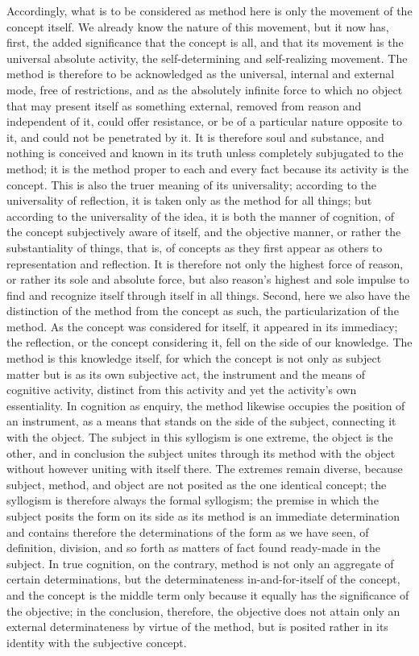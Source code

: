Accordingly, what is to be considered as method here is
only the movement of the concept itself.
We already know the nature of this movement,
but it now has, first, the added significance
that the concept is all,
and that its movement is the universal absolute activity,
the self-determining and self-realizing movement.
The method is therefore to be acknowledged as the universal,
internal and external mode, free of restrictions,
and as the absolutely infinite force to which
no object that may present itself as something external,
removed from reason and independent of it,
could offer resistance,
or be of a particular nature opposite to it,
and could not be penetrated by it.
It is therefore soul and substance,
and nothing is conceived and known in its truth
unless completely subjugated to the method;
it is the method proper to each and every fact
because its activity is the concept.
This is also the truer meaning of its universality;
according to the universality of reflection,
it is taken only as the method for all things;
but according to the universality of the idea,
it is both the manner of cognition,
of the concept subjectively aware of itself,
and the objective manner, or rather the
substantiality of things, that is,
of concepts as they first appear as others
to representation and reflection.
It is therefore not only the highest force of reason,
or rather its sole and absolute force,
but also reason's highest and sole impulse
to find and recognize itself through itself in all things.
Second, here we also have the distinction of
the method from the concept as such,
the particularization of the method.
As the concept was considered for itself,
it appeared in its immediacy;
the reflection, or the concept considering it,
fell on the side of our knowledge.
The method is this knowledge itself,
for which the concept is not only as subject matter
but is as its own subjective act,
the instrument and the means of cognitive activity,
distinct from this activity
and yet the activity's own essentiality.
In cognition as enquiry,
the method likewise occupies the position of an instrument,
as a means that stands on the side of the subject,
connecting it with the object.
The subject in this syllogism is one extreme,
the object is the other,
and in conclusion the subject unites
through its method with the object
without however uniting with itself there.
The extremes remain diverse,
because subject, method, and object are not
posited as the one identical concept;
the syllogism is therefore always the formal syllogism;
the premise in which the subject posits the form
on its side as its method is an immediate determination
and contains therefore the determinations of the form
as we have seen, of definition, division, and so forth
as matters of fact found ready-made in the subject.
In true cognition, on the contrary, method is
not only an aggregate of certain determinations,
but the determinateness in-and-for-itself of the concept,
and the concept is the middle term only
because it equally has the significance of the objective;
in the conclusion, therefore, the objective does not attain
only an external determinateness by virtue of the method,
but is posited rather in its identity with the subjective concept.

